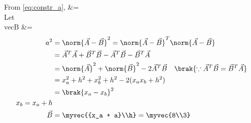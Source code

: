 
From \eqref{eq:constr_a}, &=  
\\
Let \\vec{B} &= 
\begin{align}
a^2 &=\norm{\vec{A}-\vec{B}}^2 = \norm{\vec{A}-\vec{B}}^T\norm{\vec{A}-\vec{B}}  
\\
&= \vec{A}^T\vec{A}+\vec{B}^T\vec{B}-\vec{A}^T\vec{B} - \vec{B}^T\vec{A} 
\\
&= \norm{\vec{A}}^2 + \norm{\vec{B}}^2 - 2\vec{A}^T\vec{B} \quad \brak{\because \vec{A}^T\vec{B} = \vec{B}^T\vec{A} } 
\label{eq:tri_const_norm_ac}
\\
&= x_a^2+h^2+x_b^2+h^2-2(x_a x_b + h^2)
\\
&= \brak{x_a-x_b}^2
\\
x_b = x_a + h
\\
\vec{B} &= \myvec{{x_a + a}\\h} = \myvec{8\\3}
\end{align}
%

